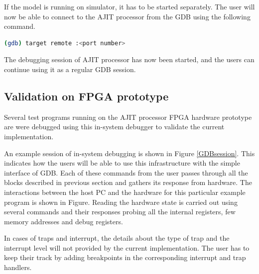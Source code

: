 If the model is running on simulator, it has to be started separately. The user will now be able to connect to the AJIT processor from the GDB using the following command.
\begin{lstlisting}[language=bash]
(gdb) target remote :<port number>
\end{lstlisting}
The debugging session of AJIT processor has now been started, and the users can continue using it as a regular GDB session.

\subsection{Validation on FPGA prototype}
Several test programs running on the AJIT processor FPGA hardware prototype are were debugged using this in-system debugger to validate the current implementation.  
 
\vspace{0.5em}
\forceindent An example session of in-system debugging is shown in Figure \ref{GDBsession}. This indicates how the users will be able to use this infrastructure with the simple interface of GDB. Each of these commands from the user passes through all the blocks described in previous section and gathers its response from hardware. The interactions between the host PC and the hardware for this particular example program is shown in Figure. Reading the hardware state is carried out using several commands and their responses probing all the internal registers, few memory addresses and debug registers.

In cases of traps and interrupt, the details about the type of trap and the interrupt level will not provided by the current implementation. The user has to keep their track by adding breakpoints in the corresponding interrupt and trap handlers.

